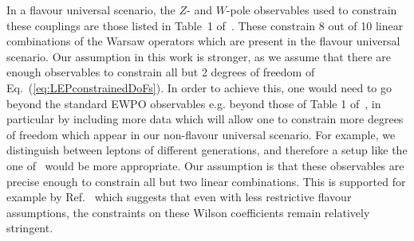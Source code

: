  In a flavour universal scenario, the 
 $Z$- and $W$-pole observables used to 
 constrain these couplings
 are those listed in Table~1 of~\cite{Falkowski:2014tna}. These constrain 8 out of 10 linear combinations of 
 the Warsaw operators which are present in the flavour universal scenario.
%
 Our
 assumption in this work is stronger, as we assume that there are enough observables to constrain all but 2 degrees of
 freedom of Eq.~(\ref{eq:LEPconstrainedDoFs}). In order to achieve this, one
 would need to go beyond the standard EWPO observables e.g.
beyond those of Table 1 of~\cite{Falkowski:2014tna},
in particular by  including more data which will allow one to constrain more
degrees of freedom which appear in our non-flavour universal scenario.
%
For example, we distinguish
between leptons of different generations, and therefore a setup like the one
of~\cite{Efrati:2015eaa} would be more appropriate.
%
Our assumption is that these observables are precise enough to constrain all but two linear combinations. This is supported for example by Ref.~\cite{Efrati:2015eaa} which suggests that even with less
restrictive flavour assumptions,
the constraints on these Wilson coefficients remain relatively stringent.


